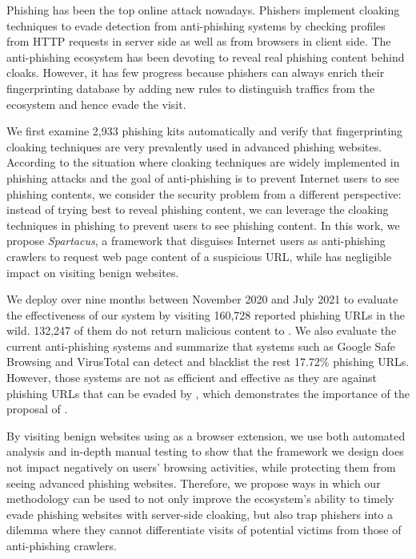 Phishing has been the top online attack nowadays.
Phishers implement cloaking techniques to evade detection from anti-phishing systems by checking profiles from HTTP requests in server side as well as from browsers in client side.
The anti-phishing ecosystem has been devoting to reveal real phishing content behind cloaks.
However, it has few progress because phishers can always enrich their fingerprinting database by adding new rules to distinguish traffics from the ecosystem and hence evade the visit.

We first examine 2,933 phishing kits automatically and verify that fingerprinting cloaking techniques are very prevalently used in advanced phishing websites.
According to the situation where cloaking techniques are widely implemented in phishing attacks and the goal of anti-phishing is to prevent Internet users to see phishing contents, we consider the security problem from a different perspective:
instead of trying best to reveal phishing content, we can leverage the cloaking techniques in phishing to prevent users to see phishing content.
In this work, we propose \emph{Spartacus}, a framework that disguises Internet users as anti-phishing crawlers to request web page content of a suspicious URL, while has negligible impact on visiting benign websites.



We deploy \spartacus over nine months between November 2020 and July 2021 to evaluate the effectiveness of our system by visiting 160,728 reported phishing URLs in the wild.
132,247 of them do not return malicious content to \spartacus.
We also evaluate the current anti-phishing systems and summarize that systems such as Google Safe Browsing and VirusTotal can detect and blacklist the rest 17.72\% phishing URLs.
However, those systems are not as efficient and effective as they are against phishing URLs that can be evaded by \spartacus,
which demonstrates the importance of the proposal of \spartacus.

By visiting benign websites using \spartacus as a browser extension, we use both automated analysis and in-depth manual testing to show that the framework we design does not impact negatively on users' browsing activities, while protecting them from seeing advanced phishing websites.
Therefore, we propose ways in which our methodology can be used to not only improve the ecosystem’s ability to timely evade phishing websites with server-side cloaking, but also trap phishers into a dilemma where they cannot differentiate visits of potential victims from those of anti-phishing crawlers.
